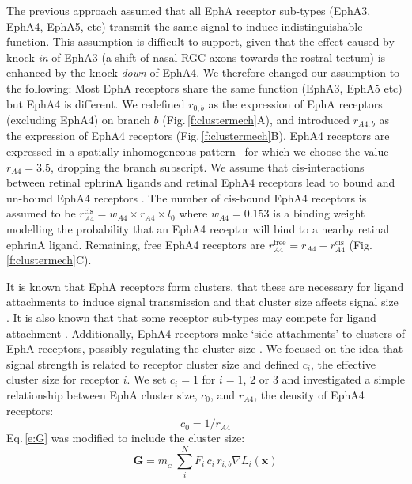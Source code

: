 \documentclass[9pt,lineno]{elife}
\begin{document}
The previous approach assumed that all EphA receptor sub-types (EphA3, EphA4, EphA5, etc) transmit the same signal to induce indistinguishable function.
This assumption is difficult to support, given that the effect caused by knock-\emph{in} of EphA3 (a shift of nasal RGC axons towards the rostral tectum) is enhanced by the knock-\emph{down} of EphA4. 
We therefore changed our assumption to the following: Most EphA receptors share the same function (EphA3, EphA5 etc) but EphA4 is different. 
We redefined $r_{\!\scriptscriptstyle 0,b}$ as the expression of EphA receptors (excluding EphA4) on branch $b$ (Fig.\,\ref{f:clustermech}A), and introduced $r_{\!\scriptscriptstyle A4,b}$ as the expression of EphA4 receptors (Fig.\,\ref{f:clustermech}B). EphA4 receptors are expressed in a spatially inhomogeneous pattern~\citep{reber_relative_2004} for which we choose the value $r_{\!\scriptscriptstyle A4} = 3.5$, dropping the branch subscript.  We assume that cis-interactions between retinal ephrinA ligands and retinal EphA4 receptors lead to bound and un-bound EphA4 receptors \citep{hornberger_modulation_1999}. The number of cis-bound EphA4 receptors is assumed to be $r_{\!\scriptscriptstyle A4}^{\mathrm{cis}} = w_{\!\scriptscriptstyle A4} \times r_{\!\scriptscriptstyle A4} \times l_0$ where $w_{\!\scriptscriptstyle A4} = 0.153$ is a binding weight modelling the probability that an EphA4 receptor will bind to a nearby retinal ephrinA ligand. Remaining, free EphA4 receptors are $r_{\!\scriptscriptstyle A4}^{\mathrm{free}} = r_{\!\scriptscriptstyle A4} - r_{\!\scriptscriptstyle A4}^{\mathrm{cis}}$ (Fig.\,\ref{f:clustermech}C). 

It is known that EphA receptors form clusters, that these are necessary for ligand attachments to induce signal transmission and that cluster size affects signal size \citep{nikolov_ephephrin_2013}. It is also known that that some receptor sub-types may compete for ligand attachment \citep{fiore_regulation_2019}.
Additionally, EphA4 receptors make `side attachments' to clusters of EphA receptors, possibly regulating the cluster size \citep{nikolov_ephephrin_2013}. 
%
We focused on the idea that signal strength is related to receptor cluster size and defined $c_i$, the effective cluster size for receptor $i$. 
We set $c_i=1$ for $i=1$, $2$ or $3$ and investigated a simple relationship between EphA cluster size, $c_0$, and $r_{\!\scriptscriptstyle A4}$, the density of EphA4 receptors:
\begin{equation}
    c_0 = 1/r_{\!\scriptscriptstyle A4}
\end{equation}
%
Eq.\,\ref{e:G} was modified to include the cluster size:
%
\begin{equation}\label{e:Gcs}
\mathbf{G} = m_{\!_G}\,\sum_i^N F_i\,c_i\,r_{i,b} \nabla L_i(\mathbf{x})
\end{equation}
\end{document}
